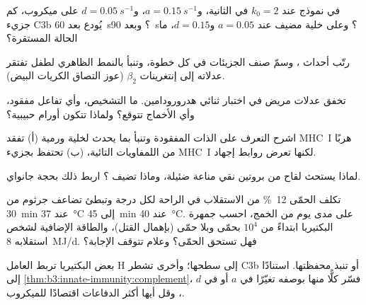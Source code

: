 \begin{exercise}[$\star\star$]\label{exo:b3:innate-immunity:5}
في نموذج  عند $k_{0} = 2$ في الثانية، و$a =
\qty{0.15}{s^{-1}}$، و$d = \qty{0.05}{s^{-1}}$ على ميكروب، كم
جزيء C3b يُودع بعد \qty{60}{s}؟ وبعد \qty{90}{s}؟ وعلى خلية
مضيف عند $a = 0.05$ و$d = 0.15$، ما الحالة المستقرة؟
\end{exercise}

\begin{exercise}[$\star\star$]\label{exo:b3:innate-immunity:6}
رتّب أحداث ، وسمّ صنف الجزيئات في كل خطوة، وتنبأ
بالنمط الظاهري لطفل تفتقر عدلاته إلى إنتغرينات
$\beta_{2}$ (عوز التصاق الكريات البيض).
\end{exercise}

\begin{exercise}[$\star\star$]\label{exo:b3:innate-immunity:7}
تخفق عدلات مريض في اختبار ثنائي هدرورودامين. ما التشخيص،
وأي تفاعل مفقود، وأي الأخماج تتوقع؟ ولماذا تتكون أورام
حبيبية؟
\end{exercise}

\begin{exercise}[$\star\star$]\label{exo:b3:innate-immunity:8}
اشرح التعرف على الذات المفقودة وتنبأ بما يحدث لخلية ورمية
(أ) تفقد MHC~I هربًا من اللمفاويات التائية، (ب) تحتفظ بجزيء
MHC~I لكنها تعرض روابط إجهاد.
\end{exercise}

\begin{exercise}[$\star\star$]\label{exo:b3:innate-immunity:9}
لماذا يستحث لقاح من بروتين نقي مناعة ضئيلة، وماذا تضيف
؟ اربط ذلك بحجة جانواي.
\end{exercise}

\begin{exercise}[$\star\star\star$]\label{exo:b3:innate-immunity:10}
تكلف الحمّى \qty{12}{\%} من الاستقلاب في الراحة لكل درجة
وتبطئ تضاعف جرثوم من \qty{30}{min} عند \qty{37}{\celsius} إلى
\qty{45}{min} عند \qty{40}{\celsius}. على مدى يوم من الخمج،
احسب جمهرة البكتيريا ابتداءً من $10^{4}$ بحمّى وبلا حمّى
(بإهمال القتل)، والطاقة الإضافية لشخص استقلابه \qty{8}{MJ/d}.
فهل تستحق الحمّى؟ وعلام تتوقف الإجابة؟
\end{exercise}

\begin{exercise}[$\star\star\star$]\label{exo:b3:innate-immunity:11}
بعض البكتيريا تربط العامل H إلى سطحها؛ وأخرى تشطر C3b أو
تنبذ محفظتها. استنادًا إلى \cref{thm:b3:innate-immunity:complement}،
فسّر كلًّا منها بوصفه تغيّرًا في $a$ أو في $d$، وقل أيها
أكثر الدفاعات اقتصادًا للميكروب.
\end{exercise}

